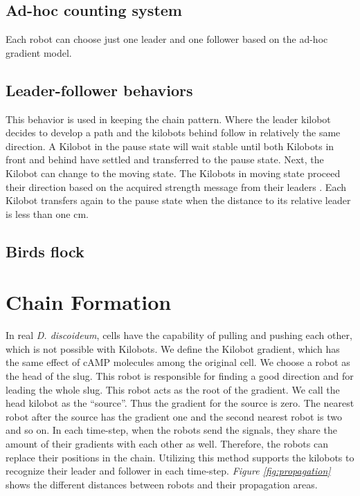 \documentclass[11pt,a4paper]{article}
\begin{document}
\subsection{Ad-hoc counting system}
Each robot can choose just one leader and one follower based on the ad-hoc gradient model. 
\subsection{Leader-follower behaviors} This behavior is used in keeping the chain pattern. Where the leader kilobot decides to develop a path and the kilobots behind follow in relatively the same direction. A Kilobot in the pause state will wait stable until both Kilobots in front and behind have settled and transferred to the pause state. Next, the Kilobot can change to the moving state.
The Kilobots in moving state proceed their direction based on the acquired strength message from their leaders \cite{Beckerleg2016EvolvingRobot}. Each Kilobot transfers again to the pause state when the distance to its relative leader is less than one cm. 
\subsection{Birds flock}

\section {Chain Formation} 
In real \textit{D. discoideum}, cells have the capability of pulling and pushing each other, which is not possible with Kilobots. We define the Kilobot gradient, which has the same effect of cAMP molecules among the original cell. We choose a robot as the head of the slug. This robot is responsible for finding a good direction and for leading the whole slug. This robot acts as the root of the gradient. We call the head kilobot as the ``source''. Thus the gradient for the source is zero. The nearest robot after the source has the gradient one and the second nearest robot is two and so on. In each time-step, when the robots send the signals, they share the amount of their gradients with each other as well. Therefore, the robots can replace their positions in the chain. Utilizing this method supports the kilobots to recognize their leader and follower in each time-step. \textit{Figure \ref{fig:propagation}} shows the different distances between robots and their propagation areas. 
\end{document}

